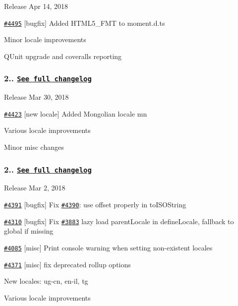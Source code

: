 \begin{DoxyItemize}
\item Release Apr 14, 2018
\item \href{https://github.com/moment/moment/pull/4495}{\tt \#4495} \mbox{[}bugfix\mbox{]} Added H\+T\+M\+L5\+\_\+\+F\+MT to moment.\+d.\+ts
\item Minor locale improvements
\item Q\+Unit upgrade and coveralls reporting
\end{DoxyItemize}

\subsubsection*{2.. \href{https://gist.github.com/marwahaha/ae895025dac3f0641fa9ec2e36d282bb}{\tt See full changelog}}


\begin{DoxyItemize}
\item Release Mar 30, 2018
\item \href{https://github.com/moment/moment/pull/4423}{\tt \#4423} \mbox{[}new locale\mbox{]} Added Mongolian locale mn
\item Various locale improvements
\item Minor misc changes
\end{DoxyItemize}

\subsubsection*{2.. \href{https://gist.github.com/marwahaha/80d19ef882b71df1948df7865efdd40e}{\tt See full changelog}}


\begin{DoxyItemize}
\item Release Mar 2, 2018
\item \href{https://github.com/moment/moment/pull/4391}{\tt \#4391} \mbox{[}bugfix\mbox{]} Fix \href{https://github.com/moment/moment/pull/4390}{\tt \#4390}\+: use offset properly in to\+I\+S\+O\+String
\item \href{https://github.com/moment/moment/pull/4310}{\tt \#4310} \mbox{[}bugfix\mbox{]} Fix \href{https://github.com/moment/moment/pull/3883}{\tt \#3883} lazy load parent\+Locale in define\+Locale, fallback to global if missing
\item \href{https://github.com/moment/moment/pull/4085}{\tt \#4085} \mbox{[}misc\mbox{]} Print console warning when setting non-\/existent locales
\item \href{https://github.com/moment/moment/pull/4371}{\tt \#4371} \mbox{[}misc\mbox{]} fix deprecated rollup options
\item New locales\+: ug-\/cn, en-\/il, tg
\item Various locale improvements
\end{DoxyItemize}

